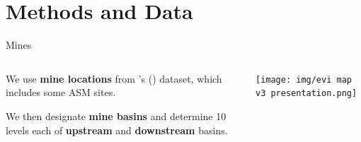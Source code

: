 \documentclass[aspectratio=169,11pt,dvipsnames, handout]{beamer}
\begin{document}

\section{Methods and Data}



\begin{frame}{Mines}
\begin{columns}
    \begin{column}{0.3\textwidth}
        We use \textbf{mine locations} from \citeauthor{maus2022}'s (\citeyear{maus2022}) dataset, which includes some ASM sites.

        \vspace{1em}

        We then designate \textbf{mine basins} and determine 10 levels each of \colorbox{upcol!30}{\bfseries upstream} and \colorbox{downcol!30}{\bfseries downstream} basins.
    \end{column}

    \begin{column}{0.65\textwidth}
        \centering
        \texttt{[image: img/evi map v3 presentation.png]}
    \end{column}
\end{columns}
\end{frame}

\end{document}
